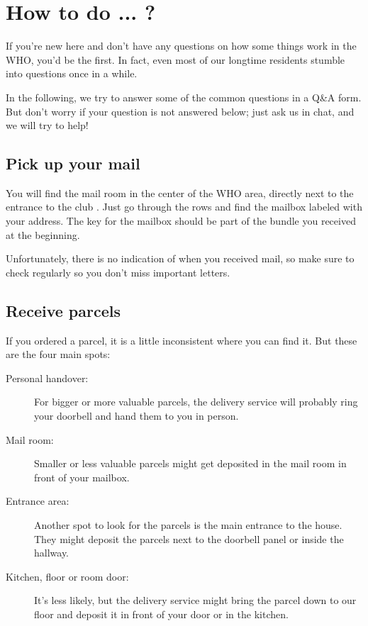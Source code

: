 \chapter{How to do ... ?} \label{chap:qna}
If you're new here and don't have any questions on how some things work in the WHO, you'd be the first. In fact, even most of our longtime residents stumble into questions once in a while.

In the following, we try to answer some of the common questions in a Q\&A form. But don't worry if your question is not answered below; just ask us in chat, and we will try to help!

\section{Pick up your mail} \label{sec:qna-mail}
You will find the mail room in the center of the WHO area, directly next to the entrance to the club . Just go through the rows and find the mailbox labeled with your address. The key for the mailbox should be part of the bundle you received at the beginning.

Unfortunately, there is no indication of when you received mail, so make sure to check regularly so you don't miss important letters.

\section{Receive parcels}
If you ordered a parcel, it is a little inconsistent where you can find it. But these are the four main spots:
\begin{description}
    \item[Personal handover:] For bigger or more valuable parcels, the delivery service will probably ring your doorbell and hand them to you in person.
    \item[Mail room:] Smaller or less valuable parcels might get deposited in the mail room in front of your mailbox.
    \item[Entrance area:] Another spot to look for the parcels is the main entrance to the house. They might deposit the parcels next to the doorbell panel or inside the hallway.
    \item[Kitchen, floor or room door:] It's less likely, but the delivery service might bring the parcel down to our floor and deposit it in front of your door or in the kitchen.
\end{description}

